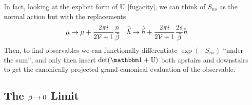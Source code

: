 In fact, looking at the explicit form of $\mathbb{U}$ \eqref{fugacity}, we can think of $S_{ns}$ as the normal action but with the replacements
\begin{align}
	\tilde{\mu}&\rightarrow \tilde{\mu} + \frac{2\pi i}{2\mathcal{V}+1} \frac{n}{\tilde{\beta}}
	&
	\tilde{\vec{h}} \rightarrow \tilde{\vec{h}} + \frac{2\pi i}{2\mathcal{V}+1} \frac{2s}{\tilde{\beta}} \hat{h}
\end{align}
Then, to find observables we can functionally differentiate $\exp(-S_{ns})$ ``under the sum'', and only then insert $\det(\one+\UU)$ both upstairs and downstairs to get the canonically-projected grand-canonical evaluation of the observable.

\subsection{The $\beta\rightarrow0$ Limit}\label{sec:canonical infinite temperature}

